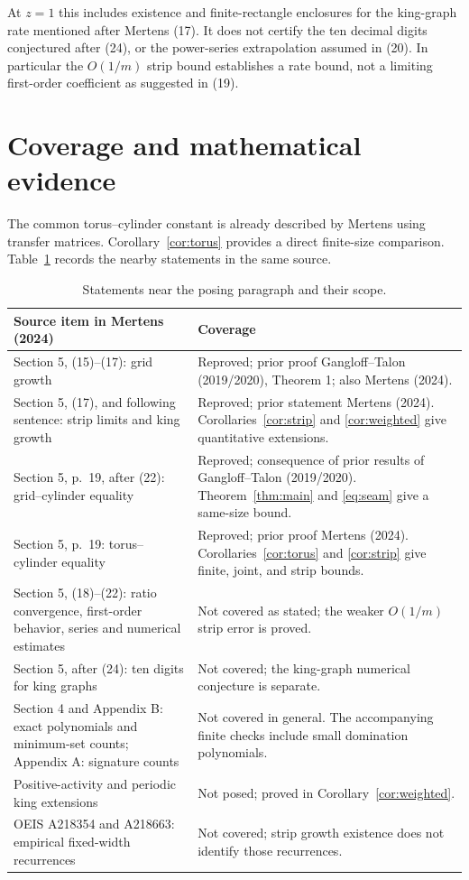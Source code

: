 \documentclass[11pt]{article}
\begin{document}
At $z=1$ this includes existence and finite-rectangle enclosures for the
king-graph rate mentioned after Mertens (17). It does not certify the ten
decimal digits conjectured after (24), or the power-series extrapolation
assumed in (20). In particular the $O(1/m)$ strip bound establishes a rate
bound, not a limiting first-order coefficient as suggested in (19).

\section{Coverage and mathematical evidence}
The common torus--cylinder constant is already described by Mertens
\cite[p.~19]{mertens} using transfer matrices. Corollary~\ref{cor:torus}
provides a direct finite-size comparison. Table~\ref{tab:coverage} records
the nearby statements in the same source.

\begin{table}[ht]
\centering\small
\begin{tabular}{@{}p{.43\linewidth}p{.51\linewidth}@{}}
\toprule
Source item in Mertens (2024) & Coverage\\
\midrule
Section 5, (15)--(17): grid growth & Reproved; prior proof Gangloff--Talon
(2019/2020), Theorem 1; also Mertens (2024).\\[3pt]
Section 5, (17), and following sentence: strip limits and king growth &
Reproved; prior statement Mertens (2024). Corollaries~\ref{cor:strip}
and \ref{cor:weighted} give quantitative extensions.\\[3pt]
Section 5, p.~19, after (22): grid--cylinder equality & Reproved;
consequence of prior results of Gangloff--Talon (2019/2020).
Theorem~\ref{thm:main} and \eqref{eq:seam} give a same-size bound.\\[3pt]
Section 5, p.~19: torus--cylinder equality & Reproved; prior proof
Mertens (2024). Corollaries~\ref{cor:torus} and \ref{cor:strip}
give finite, joint, and strip bounds.\\[3pt]
Section 5, (18)--(22): ratio convergence, first-order behavior,
series and numerical estimates & Not covered as stated; the weaker
$O(1/m)$ strip error is proved.\\[3pt]
Section 5, after (24): ten digits for king graphs & Not covered;
the king-graph numerical conjecture is separate.\\[3pt]
Section 4 and Appendix B: exact polynomials and minimum-set counts;
Appendix A: signature counts & Not covered in general. The accompanying
finite checks include small domination polynomials.\\[3pt]
Positive-activity and periodic king extensions & Not posed; proved in
Corollary~\ref{cor:weighted}.\\[3pt]
OEIS A218354 and A218663: empirical fixed-width recurrences & Not covered;
strip growth existence does not identify those recurrences.\\
\bottomrule
\end{tabular}
\caption{Statements near the posing paragraph and their scope.}
\label{tab:coverage}
\end{table}
\end{document}
